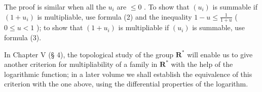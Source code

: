 The proof is similar when all the \(u_{i}\) are \(\leqslant 0\) . To show that \((u_{i})\) is summable if \((1 + u_{i})\) is multipliable, use formula (2) and the inequality \(1 - u \leqslant \frac{1}{1 + u}\) ( \(0 \leqslant u < 1\) ); to show that \((1 + u_{i})\) is multipliable if \((u_{i})\) is summable, use formula (3).

In Chapter V (§ 4), the topological study of the group \(\mathbf{R}^*\) will enable us to give another criterion for multipliability of a family in \(\mathbf{R}^*\) with the help of the logarithmic function; in a later volume we shall establish the equivalence of this criterion with the one above, using the differential properties of the logarithm.

